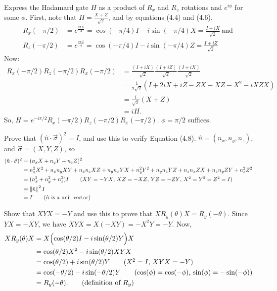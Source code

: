  Express the Hadamard gate $H$ as a product of $R_x$ and $R_z$ rotations and $e^{i\phi}$ for some $\phi$.
\Soln First, note that $H = \frac{X + Z}{\sqrt{2}}$, and by equations (4.4) and (4.6), 
\begin{align*}
R_x(-\pi/2) &= e^{\frac{i\pi X}{4}} = \cos(-\pi/4)I-i\sin(-\pi/4)X = \frac{I+iX}{\sqrt{2}} \mathrm{\ and\ } \\
R_z(-\pi/2) &= e^{\frac{i\pi Z}{4}} = \cos(-\pi/4)I-i\sin(-\pi/4)Z = \frac{I+iZ}{\sqrt{2}}
\end{align*}
Now:
\begin{align*}
R_x(-\pi/2) R_z(-\pi/2)R_x(-\pi/2) &= \frac{(I+iX)}{\sqrt{2}}\frac{(I+iZ)}{\sqrt{2}}\frac{(I+iX)}{\sqrt{2}} \\
 &= \frac{1}{2\sqrt{2}}(I+2iX+iZ-ZX-XZ-X^2-iXZX) \\
 &= \frac{i}{\sqrt{2}}(X+Z) \tag{$X^2=I$, $XZ=-ZX$, $XZX = -Z$} \\
 &= iH.
\end{align*}
So, $ H = e^{-i\pi/2}R_x(-\pi/2) R_z(-\pi/2)R_x(-\pi/2)$.  $\phi = \pi/2$ suffices.


  Prove that $(\hat{n}\cdot \vec{\sigma})^2 = I$, and use this to verify Equation (4.8).
\Soln  $\hat{n} = (n_x, n_y, n_z)$, and $\vec{\sigma} = (X, Y, Z)$, so 
\begin{align*} (\hat{n}\cdot\vec{\sigma})^2 &= (n_xX+n_yY+n_zZ)^2 \\
&= n_x^2 X^2 + n_xn_y XY + n_xn_zXZ+n_yn_xYX+n_y^2Y^2+n_yn_zYZ + n_zn_xZX+n_zn_yZY+n_z^2Z^2 \\
&= (n_x^2+n_y^2+n_z^2)I \tag{$XY=-YX$, $XZ=-XZ$, $YZ=-ZY$, $X^2=Y^2=Z^2=I$} \\
&= \norm{\hat{n}}^2 I \\
&= I \tag{$\hat{n}$ is a unit vector}
\end{align*}

 Show that $XYX = -Y$ and use this to prove that $XR_y(\theta)X = R_y(-\theta)$.
\Soln Since $YX = -XY$, we have $XYX= X(-XY) = -X^2Y = -Y$.  Now, 
\begin{align*}
XR_y(\theta)X &= X\Bigl(\cos(\theta/2)I-i\sin(\theta/2)Y\Bigr)X \\
& = \cos(\theta/2)X^2-i\sin(\theta/2)XYX\\
&=\cos(\theta/2)+i\sin(\theta/2)Y \tag{$X^2=I$, $XYX=-Y$}\\
&= \cos(-\theta/2)-i\sin(-\theta/2)Y \tag{$\cos(\phi) = \cos(-\phi)$, $\sin(\phi) = - \sin(-\phi)$}\\
&=R_y(-\theta). \tag{definition of $R_y$}
\end{align*}

